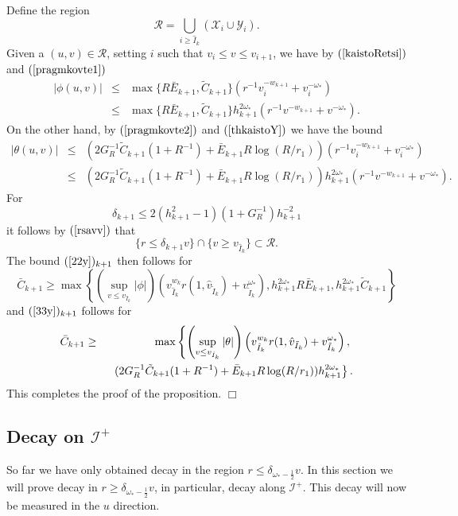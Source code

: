 \documentclass{article}
\begin{document}
Define the region
\[
\mathcal{R}=\bigcup_{i\ge \hat{I}_k}
\left(\mathcal{X}_i\cup\mathcal{Y}_i\right).
\]
Given a $(u,v)\in\mathcal{R}$, 
setting $i$ such that $v_i\le v\le v_{i+1}$,
we have by $(\ref{kaistoRetsi})$ and $(\ref{pragmkovte1})$
\begin{eqnarray*}
|\phi(u,v)|	&\le& 	\max\{R\bar{E}_{k+1}, \tilde{C}_{k+1}\}
				\left(r^{-1}v_i^{-w_{k+1}}+v_i^{-\omega_*}\right)\\
		&\le& 	\max\{R\bar{E}_{k+1}, \tilde{C}_{k+1}\}
				h_{k+1}^{2\omega_*}\left(r^{-1}v^{-w_{k+1}}+v^{-\omega_*}
				\right).
\end{eqnarray*}
On the other hand, by $(\ref{pragmkovte2})$ and $(\ref{thkaistoY})$
we have the  bound
\begin{eqnarray*}
|\theta(u,v)|	&\le& 	(2G_R^{-1}{\tilde{C}}_{k+1}(1+R^{-1})+
				\bar{E}_{k+1}R\log (R/r_1))
				\left(r^{-1}v_i^{-w_{k+1}}+v_i^{-\omega_*}\right)\\
		&\le& 	(2G_R^{-1}{\tilde{C}}_{k+1}(1+R^{-1})+
				\bar{E}_{k+1}R\log (R/r_1))
				h_{k+1}^{2\omega_*}\left(r^{-1}v^{-w_{k+1}}+v^{-\omega_*}
				\right).
\end{eqnarray*}
For 
\[
\delta_{k+1}\le 2(h^2_{k+1}-1)(1+G^{-1}_R)h^{-2}_{k+1}
\]
it follows by $(\ref{rsavv})$ that 
\[
\{r\le\delta_{k+1}v\}\cap\{v\ge v_{\hat{I}_k}\}\subset\mathcal{R}.
\]
The bound $(\ref{22y})_{k+1}$ 
then follows for
\[
\bar{C}_{k+1}\ge 
\max\left\{\left(\sup_{v\le v_{\hat{I}_k}}|\phi|\right)\left(v_{\hat{I}_k}^{w_k}
r(1,\hat{v}_{\tilde{I}_k})+v^{\omega_*}_{\tilde{I}_k}\right),
h_{k+1}^{2\omega_*}R\bar{E}_{k+1}, h_{k+1}^{2\omega_*}\tilde{C}_{k+1}\right\}
\]
and
$(\ref{33y})_{k+1}$ follows for
\begin{eqnarray*}
\bar{C}_{k+1}&\ge& 
\max\left\{\left(\sup_{v\le v_{\hat{I}_k}}|\theta|\right)\left(v_{\hat{I}_k}^{w_k}
r(1,\hat{v}_{\tilde{I}_k})+v^{\omega_*}_{\tilde{I}_k}\right),\right.\\
&&\hbox{\ }\left.
(2G_R^{-1}{\tilde{C}}_{k+1}(1+R^{-1})+
				\bar{E}_{k+1}R\log (R/r_1))
				h_{k+1}^{2\omega_*}
\right\}.
\end{eqnarray*}
This completes the proof of the proposition. $\Box$

\subsection{Decay on $\mathcal{I}^+$}
So far we have only obtained decay in the region
$r\le \delta_{\omega_*-\frac12}v$.
In this section we will prove decay in $r\ge\delta_{\omega_*-\frac12}v$,
in particular, decay along $\mathcal{I}^+$.  This decay will now be measured
in the $u$ direction.
\end{document}
